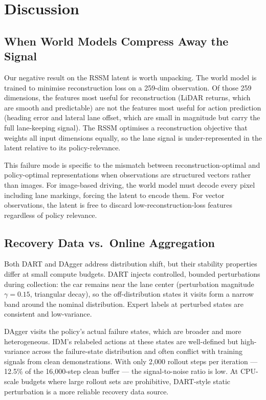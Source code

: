 \documentclass{article}
\begin{document}
\section{Discussion}
\label{sec:discussion}

\subsection{When World Models Compress Away the Signal}

Our negative result on the RSSM latent is worth unpacking. The world model
is trained to minimise reconstruction loss on a 259-dim observation. Of
those 259 dimensions, the features most useful for reconstruction (LiDAR
returns, which are smooth and predictable) are not the features most useful
for action prediction (heading error and lateral lane offset, which are
small in magnitude but carry the full lane-keeping signal). The RSSM
optimises a reconstruction objective that weights all input dimensions
equally, so the lane signal is under-represented in the latent relative to
its policy-relevance.

This failure mode is specific to the mismatch between reconstruction-optimal
and policy-optimal representations when observations are structured vectors
rather than images. For image-based driving, the world model must decode
every pixel including lane markings, forcing the latent to encode them. For
vector observations, the latent is free to discard low-reconstruction-loss
features regardless of policy relevance.

\subsection{Recovery Data vs.\ Online Aggregation}

Both DART and DAgger address distribution shift, but their stability
properties differ at small compute budgets. DART injects controlled, bounded
perturbations during collection: the car remains near the lane center
(perturbation magnitude $\gamma = 0.15$, triangular decay), so the
off-distribution states it visits form a narrow band around the nominal
distribution. Expert labels at perturbed states are consistent and
low-variance.

DAgger visits the policy's actual failure states, which are broader and more
heterogeneous. IDM's relabeled actions at these states are well-defined but
high-variance across the failure-state distribution and often conflict with
training signals from clean demonstrations. With only 2{,}000 rollout steps
per iteration --- 12.5\% of the 16{,}000-step clean buffer --- the
signal-to-noise ratio is low. At CPU-scale budgets where large rollout sets
are prohibitive, DART-style static perturbation is a more reliable recovery
data source.
\end{document}
